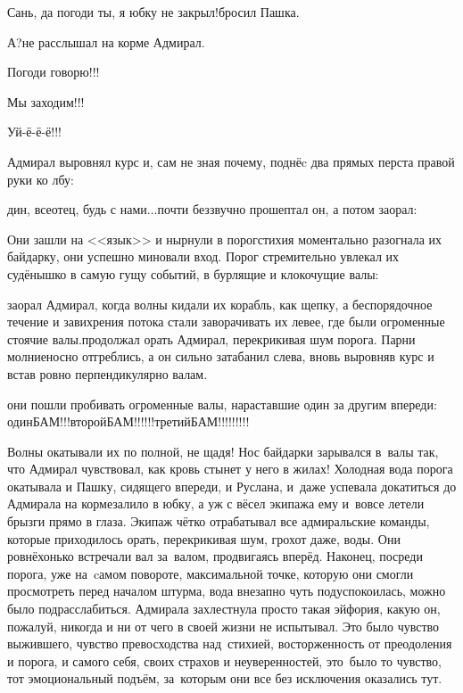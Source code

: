 \diagdash Сань, да погоди ты, я юбку не закрыл!\mdash бросил Пашка.

\diagdash А?\mdash не расслышал на корме Адмирал.

\diagdash Погоди говорю!!!

\diagdash Мы заходим!!!

\diagdash Уй-ё-ё-ё!!!

Адмирал выровнял курс и, сам не зная почему, поднёc два прямых перста правой руки ко лбу:

дин, всеотец, будь с нами$\ldots$\mdash почти беззвучно прошептал он, а потом заорал:

Они зашли на <<язык>> и нырнули в порог\mdash стихия моментально разогнала их байдарку, они успешно миновали вход. Порог стремительно увлекал их судёнышко в самую гущу событий, в бурлящие и клокочущие валы:

\mdash заорал Адмирал, когда волны кидали их корабль, как щепку, а беспорядочное течение и завихрения потока стали заворачивать их левее, где были огроменные стоячие валы.\mdash продолжал орать Адмирал, перекрикивая шум порога. Парни молниеносно отгреблись, а он сильно затабанил слева, вновь выровняв курс и встав ровно перпендикулярно валам. 

\mdash они пошли пробивать огроменные валы, нараставшие один за другим впереди: один\mdash БАМ!!!\mdash второй\mdash БАМ!!!!!!\mdash третий\mdash БАМ!!!!!!!!!

Волны окатывали их по полной, не щадя! Нос байдарки зарывался в~валы так, что Адмирал чувствовал, как кровь стынет у него в жилах! Холодная вода порога окатывала и Пашку, сидящего впереди, и Руслана, и~даже успевала докатиться до Адмирала на корме\mdash залило в юбку, а уж с вёсел экипажа ему и~вовсе летели брызги прямо в глаза. Экипаж чётко отрабатывал все адмиральские команды, которые приходилось орать, перекрикивая шум, грохот даже, воды. Они ровнёхонько встречали вал за~валом, продвигаясь вперёд. Наконец, посреди порога, уже на~cамом повороте, максимальной точке, которую они смогли просмотреть перед началом штурма, вода внезапно чуть подуспокоилась, можно было подрасслабиться. Адмирала захлестнула просто такая эйфория, какую он, пожалуй, никогда и ни от чего в своей жизни не испытывал. Это было чувство выжившего, чувство превосходства над~стихией, восторженность от преодоления и порога, и самого себя, своих страхов и неуверенностей, это~было то чувство, тот эмоциональный подъём, за~которым они все без исключения оказались тут. 

